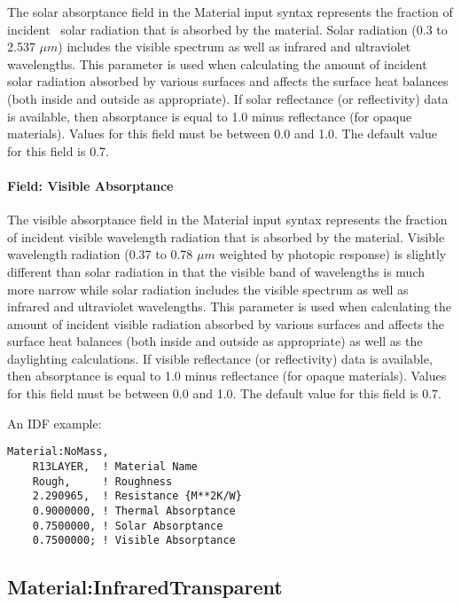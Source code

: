 The solar absorptance field in the Material input syntax represents the fraction of incident~ solar radiation that is absorbed by the material. Solar radiation (0.3 to 2.537 $\mu{}m$) includes the visible spectrum as well as infrared and ultraviolet wavelengths. This parameter is used when calculating the amount of incident solar radiation absorbed by various surfaces and affects the surface heat balances (both inside and outside as appropriate). If solar reflectance (or reflectivity) data is available, then absorptance is equal to 1.0 minus reflectance (for opaque materials). Values for this field must be between 0.0 and 1.0. The default value for this field is 0.7.

\paragraph{Field: Visible Absorptance}\label{field-visible-absorptance-1}

The visible absorptance field in the Material input syntax represents the fraction of incident visible wavelength radiation that is absorbed by the material. Visible wavelength radiation (0.37 to 0.78 $\mu{}m$ weighted by photopic response) is slightly different than solar radiation in that the visible band of wavelengths is much more narrow while solar radiation includes the visible spectrum as well as infrared and ultraviolet wavelengths. This parameter is used when calculating the amount of incident visible radiation absorbed by various surfaces and affects the surface heat balances (both inside and outside as appropriate) as well as the daylighting calculations. If visible reflectance (or reflectivity) data is available, then absorptance is equal to 1.0 minus reflectance (for opaque materials). Values for this field must be between 0.0 and 1.0. The default value for this field is 0.7.

An IDF example:

\begin{lstlisting}
Material:NoMass,
    R13LAYER,  ! Material Name
    Rough,     ! Roughness
    2.290965,  ! Resistance {M**2K/W}
    0.9000000, ! Thermal Absorptance
    0.7500000, ! Solar Absorptance
    0.7500000; ! Visible Absorptance
\end{lstlisting}

\subsection{Material:InfraredTransparent}\label{materialinfraredtransparent}

